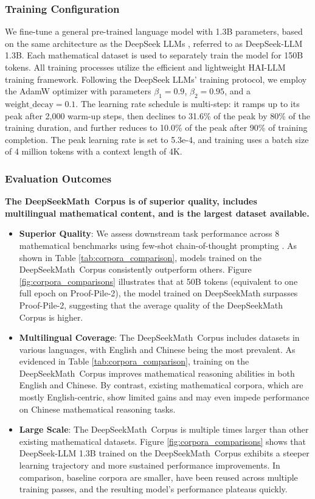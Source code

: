 \subsubsection{Training Configuration}
\label{sec:quality-policy}
We fine-tune a general pre-trained language model with 1.3B parameters, based on the same architecture as the DeepSeek LLMs \citep{deepseek-llm}, referred to as DeepSeek-LLM 1.3B. Each mathematical dataset is used to separately train the model for 150B tokens. All training processes utilize the efficient and lightweight HAI-LLM \citep{haillm} training framework. Following the DeepSeek LLMs' training protocol, we employ the AdamW optimizer \citep{adamW} with parameters $\beta_1=0.9$, $\beta_2=0.95$, and a $\mathrm{weight\_decay}=0.1$. The learning rate schedule is multi-step: it ramps up to its peak after 2,000 warm-up steps, then declines to 31.6\% of the peak by 80\% of the training duration, and further reduces to 10.0\% of the peak after 90\% of training completion. The peak learning rate is set to 5.3e-4, and training uses a batch size of 4 million tokens with a context length of 4K.

\subsubsection{Evaluation Outcomes}

\textbf{The DeepSeekMath~Corpus is of superior quality, includes multilingual mathematical content, and is the largest dataset available.}

\begin{itemize}[topsep=0pt]
    \item \textbf{Superior Quality}:
    We assess downstream task performance across 8 mathematical benchmarks using few-shot chain-of-thought prompting \cite{cot}. As shown in Table \ref{tab:corpora_comparison}, models trained on the DeepSeekMath~Corpus consistently outperform others. Figure \ref{fig:corpora_comparisons} illustrates that at 50B tokens (equivalent to one full epoch on Proof-Pile-2), the model trained on DeepSeekMath surpasses Proof-Pile-2, suggesting that the average quality of the DeepSeekMath Corpus is higher.
    \item \textbf{Multilingual Coverage}:
    The DeepSeekMath~Corpus includes datasets in various languages, with English and Chinese being the most prevalent. As evidenced in Table \ref{tab:corpora_comparison}, training on the DeepSeekMath~Corpus improves mathematical reasoning abilities in both English and Chinese. By contrast, existing mathematical corpora, which are mostly English-centric, show limited gains and may even impede performance on Chinese mathematical reasoning tasks.
    \item \textbf{Large Scale}:
    The DeepSeekMath~Corpus is multiple times larger than other existing mathematical datasets. Figure \ref{fig:corpora_comparisons} shows that DeepSeek-LLM 1.3B trained on the DeepSeekMath~Corpus exhibits a steeper learning trajectory and more sustained performance improvements. In comparison, baseline corpora are smaller, have been reused across multiple training passes, and the resulting model's performance plateaus quickly.
\end{itemize}

